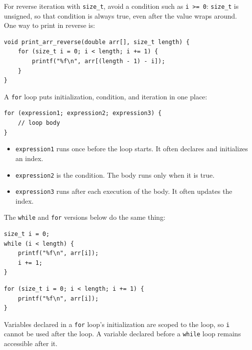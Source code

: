 \documentclass[11pt,a4paper]{article}
\providecommand{\tightlist}{\setlength{\itemsep}{0pt}\setlength{\parskip}{0pt}}
\begin{document}
For reverse iteration with \texttt{size\_t}, avoid a condition such as \texttt{i\ \textgreater{}=\ 0}: \texttt{size\_t} is unsigned, so that condition is always true, even after the value wraps around. One way to print in reverse is:

\begin{lstlisting}[style=cscode]
void print_arr_reverse(double arr[], size_t length) {
    for (size_t i = 0; i < length; i += 1) {
        printf("%f\n", arr[(length - 1) - i]);
    }
}
\end{lstlisting}

\label{for-loops}
\hypertarget{for-loops}{}

A \texttt{for} loop puts initialization, condition, and iteration in one place:

\begin{lstlisting}[style=cscode]
for (expression1; expression2; expression3) {
    // loop body
}
\end{lstlisting}

\begin{itemize}
\tightlist
\item
  \texttt{expression1} runs once before the loop starts. It often declares and initializes an index.
\item
  \texttt{expression2} is the condition. The body runs only when it is true.
\item
  \texttt{expression3} runs after each execution of the body. It often updates the index.
\end{itemize}

The \texttt{while} and \texttt{for} versions below do the same thing:

\begin{lstlisting}[style=cscode]
size_t i = 0;
while (i < length) {
    printf("%f\n", arr[i]);
    i += 1;
}
\end{lstlisting}

\begin{lstlisting}[style=cscode]
for (size_t i = 0; i < length; i += 1) {
    printf("%f\n", arr[i]);
}
\end{lstlisting}

Variables declared in a \texttt{for} loop's initialization are scoped to the loop, so \texttt{i} cannot be used after the loop. A variable declared before a \texttt{while} loop remains accessible after it.

\label{42-loop-control-with-break-continue-return}
\hypertarget{42-loop-control-with-break-continue-return}{}
\end{document}
